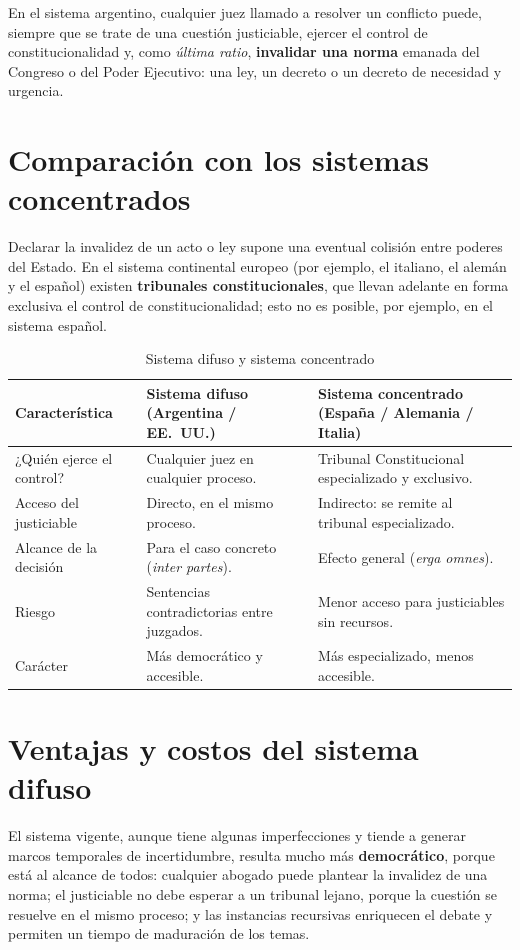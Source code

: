 \documentclass[12pt,oneside]{book}
\begin{document}
En el sistema argentino, cualquier juez llamado a resolver un conflicto puede, siempre que se trate de una cuestión justiciable, ejercer el control de constitucionalidad y, como \textit{última ratio}, \textbf{invalidar una norma} emanada del Congreso o del Poder Ejecutivo: una ley, un decreto o un decreto de necesidad y urgencia.

\section{Comparación con los sistemas concentrados}

Declarar la invalidez de un acto o ley supone una eventual colisión entre poderes del Estado. En el sistema continental europeo (por ejemplo, el italiano, el alemán y el español) existen \textbf{tribunales constitucionales}, que llevan adelante en forma exclusiva el control de constitucionalidad; esto no es posible, por ejemplo, en el sistema español.

\begin{table}[H]
\centering
\small
\caption{Sistema difuso y sistema concentrado}
\begin{tabularx}{\textwidth}{Q{0.22\textwidth}YY}
\toprule
\textbf{Característica} & \textbf{Sistema difuso (Argentina / EE.\ UU.)} & \textbf{Sistema concentrado (España / Alemania / Italia)} \\
\midrule
¿Quién ejerce el control? & Cualquier juez en cualquier proceso. & Tribunal Constitucional especializado y exclusivo. \\
Acceso del justiciable & Directo, en el mismo proceso. & Indirecto: se remite al tribunal especializado. \\
Alcance de la decisión & Para el caso concreto (\textit{inter partes}). & Efecto general (\textit{erga omnes}). \\
Riesgo & Sentencias contradictorias entre juzgados. & Menor acceso para justiciables sin recursos. \\
Carácter & Más democrático y accesible. & Más especializado, menos accesible. \\
\bottomrule
\end{tabularx}
\end{table}

\section{Ventajas y costos del sistema difuso}

El sistema vigente, aunque tiene algunas imperfecciones y tiende a generar marcos temporales de incertidumbre, resulta mucho más \textbf{democrático}, porque está al alcance de todos: cualquier abogado puede plantear la invalidez de una norma; el justiciable no debe esperar a un tribunal lejano, porque la cuestión se resuelve en el mismo proceso; y las instancias recursivas enriquecen el debate y permiten un tiempo de maduración de los temas.
\end{document}
